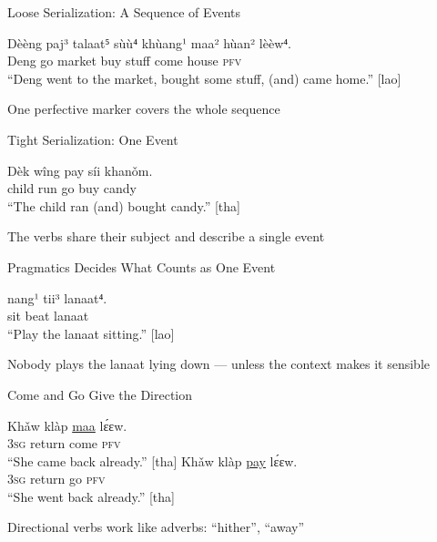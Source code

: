 \documentclass{beamer}
\begin{document}
\begin{frame}{Loose Serialization: A Sequence of Events}
  \begin{exe}
    \ex
    \gll Dèèng paj³ talaat⁵ sùù⁴ khùang¹ maa² hùan² lèèw⁴. \\
         Deng go market buy stuff come house \textsc{pfv} \\
    \trans ``Deng went to the market, bought some stuff, (and) came home.'' [lao]
  \end{exe}
  \vfill
  \large
  One perfective marker covers the whole sequence
\end{frame}

\begin{frame}{Tight Serialization: One Event}
  \begin{exe}
    \ex
    \gll Dèk wîng pay síi khanǒm. \\
         child run go buy candy \\
    \trans ``The child ran (and) bought candy.'' [tha]
  \end{exe}
  \vfill
  \large
  The verbs share their subject and describe a single event
\end{frame}

\begin{frame}{Pragmatics Decides What Counts as One Event}
  \begin{exe}
    \ex
    \gll nang¹ tii³ lanaat⁴. \\
         sit beat lanaat \\
    \trans ``Play the lanaat sitting.'' [lao]
  \end{exe}
  \vfill
  \large
  Nobody plays the lanaat lying down --- unless the context makes it sensible
\end{frame}

\begin{frame}{Come and Go Give the Direction}
  \begin{exe}
    \ex
    \gll Khǎw klàp \ul{maa} lɛ́ɛw. \\
         3\textsc{sg} return come \textsc{pfv} \\
    \trans ``She came back already.'' [tha]
    \ex
    \gll Khǎw klàp \ul{pay} lɛ́ɛw. \\
         3\textsc{sg} return go \textsc{pfv} \\
    \trans ``She went back already.'' [tha]
  \end{exe}
  \vfill
  \large
  Directional verbs work like adverbs: ``hither'', ``away''
\end{frame}
\end{document}
